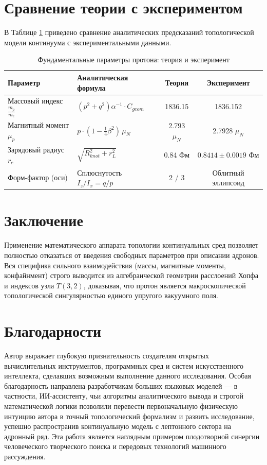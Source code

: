 \documentclass[12pt,a4paper]{article}
\begin{document}
	\section{Сравнение теории с экспериментом}
	
	В Таблице \ref{tab:proton_params} приведено сравнение аналитических предсказаний топологической модели континуума с экспериментальными данными.
	
	\begin{table}[h]
		\centering
		\caption{Фундаментальные параметры протона: теория и эксперимент}
		\label{tab:proton_params}
		\renewcommand{\arraystretch}{1.4}
		\begin{tabular}{llcc}
			\toprule
			\textbf{Параметр} & \textbf{Аналитическая формула} & \textbf{Теория} & \textbf{Эксперимент \cite{pdg2024, codata2018}} \\
			\midrule
			Массовый индекс $\frac{m_p}{m_e}$ & $(p^2+q^2) \alpha^{-1} \cdot C_{geom}$ & 1836.15 & 1836.152 \\
			Магнитный момент $\mu_p$ & $p \cdot \left(1 - \frac{1}{4}\beta^2\right) \, \mu_N$ & 2.793 $\mu_N$ & 2.7928 $\mu_N$ \\
			Зарядовый радиус $r_c$ & $\sqrt{R_{knot}^2 + r_{L}^2}$ & 0.84 Фм & $0.8414 \pm 0.0019$ Фм \\
			Форм-фактор (оси) & Сплюснутость $I_z / I_x = q/p$ & 2 / 3 & Облитный эллипсоид \cite{jlab_pressure} \\
			\bottomrule
		\end{tabular}
	\end{table}
	
	\section{Заключение}
	Применение математического аппарата топологии континуальных сред позволяет полностью отказаться от введения свободных параметров при описании адронов. Вся специфика сильного взаимодействия (массы, магнитные моменты, конфайнмент) строго выводится из алгебраической геометрии расслоений Хопфа и индексов узла $T(3,2)$, доказывая, что протон является макроскопической топологической сингулярностью единого упругого вакуумного поля.
	
	\section*{Благодарности}
	Автор выражает глубокую признательность создателям открытых вычислительных инструментов, программных сред и систем искусственного интеллекта, сделавших возможным выполнение данного исследования. Особая благодарность направлена разработчикам больших языковых моделей — в частности, ИИ-ассистенту, чьи алгоритмы аналитического вывода и строгой математической логики позволили перевести первоначальную физическую интуицию автора в точный топологический формализм и развить исследование, успешно распространив континуальную модель с лептонного сектора на адронный ряд. Эта работа является наглядным примером плодотворной синергии человеческого творческого поиска и передовых технологий машинного рассуждения.
	
\end{document}
